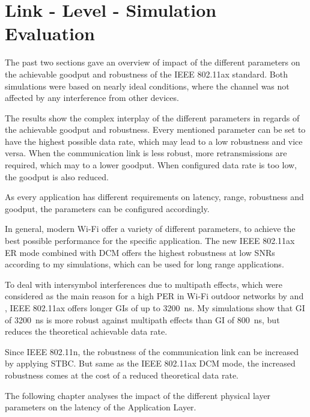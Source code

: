 \documentclass[]{nsm-thesis}
\begin{document}






\section{Link - Level - Simulation Evaluation}

The past two sections gave an overview of impact of the different parameters on the achievable goodput and robustness of the IEEE 802.11ax standard.
Both simulations were based on nearly ideal conditions, where the channel was not affected by any interference from other devices.

The results show the complex interplay of the different parameters in regards of the achievable goodput and robustness.
Every mentioned parameter can be set to have the highest possible data rate, which may lead to a low robustness and vice versa.
When the communication link is less robust, more retransmissions are required, which may to a lower goodput.
When configured data rate is too low, the goodput is also reduced.

As every application has different requirements on
latency, range, robustness and goodput, the parameters can be configured accordingly.

In general, modern Wi-Fi offer a variety of different parameters, to achieve the best possible performance for the specific application.
The new IEEE 802.11ax \ac{ER} mode combined with \ac{DCM} offers the highest robustness at low \ac{SNR}s according to my simulations, which can
be used for long range applications.

To deal with intersymbol interferences due to multipath effects, which were considered as the main reason for a high \ac{PER} in  Wi-Fi outdoor networks by
\cite{sheth_packet_2007} and \cite{aguayo_link-level_2004}, IEEE 802.11ax offers longer \ac{GI}s of up to \SI{3200}{\nano\second}.
My simulations show that \ac{GI} of \SI{3200}{\nano\second} is more robust against multipath effects than \ac{GI} of \SI{800}{\nano\second}, but
reduces the theoretical achievable data rate.

Since IEEE 802.11n, the robustness of the communication link can be increased by applying \ac{STBC}.
But same as the IEEE 802.11ax \ac{DCM} mode, the
increased robustness comes at the cost of a reduced theoretical data rate.

The following chapter analyses the impact of the different physical layer parameters on the latency of the Application Layer.
\end{document}

